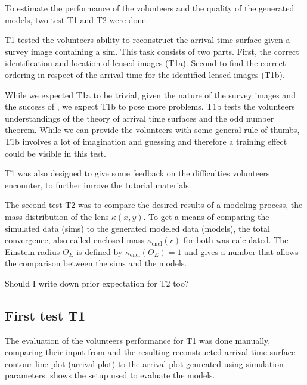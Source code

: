 To estimate the performance of the volunteers and the quality of the generated models, two test T1 and T2 were done.

T1 tested the volunteers ability to reconstruct the arrival time surface given a survey image containing a sim.
This task consists of two parts.
First, the correct identification and location of lensed images (T1a).
Second to find the correct ordering in respect of the arrival time for the identified lensed images (T1b).

While we expected T1a to be trivial, given the nature of the survey images and the success of \sw, we expect T1b to pose more problems.
T1b tests the volunteers understandings of the theory of arrival time surfaces and the odd number theorem.
While we can provide the volunteers with some general rule of thumbs, T1b involves a lot of imagination and guessing and therefore a training effect could be visible in this test.

T1 was also designed to give some feedback on the difficulties volunteers encounter, to further imrove the tutorial materials.

The second test T2 was to compare the desired results of a modeling process, the mass distribution of the lens $\kappa(x, y)$.
To get a means of comparing the simulated data (sims) to the generated modeled data (models), the total convergence, also called enclosed mass $\kappa_{\text{encl}}(r)$ for both was calculated.
The Einstein radius $\Theta_E$ is defined by $\kappa_{\text{encl}}(\Theta_E)=1$ and gives a number that allows the comparison between the sims and the models.

\todo{!} Should I write down prior expectation for T2 too?




\subsection{First test T1} \label{sec:tests.t1}

The evaluation of the volunteers performance for T1 was done manually, comparing their input from \spl and the resulting reconstructed arrival time surface contour line plot (arrival plot) to the arrival plot genreated using simulation parameters.
 shows the setup used to evaluate the models.

